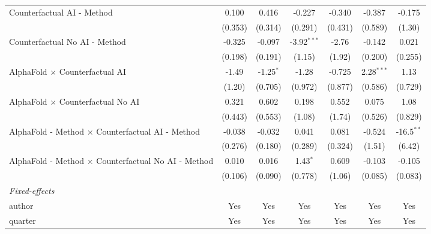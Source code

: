 \begin{tabular}{lcccccc}
   Counterfactual AI - Method                                 & 0.100   & 0.416       & -0.227        & -0.340     & -0.387       & -0.175\\   
                                                              & (0.353) & (0.314)     & (0.291)       & (0.431)    & (0.589)      & (1.30)\\   
   Counterfactual No AI - Method                              & -0.325  & -0.097      & -3.92$^{***}$ & -2.76      & -0.142       & 0.021\\   
                                                              & (0.198) & (0.191)     & (1.15)        & (1.92)     & (0.200)      & (0.255)\\   
   AlphaFold $\times$ Counterfactual AI                       & -1.49   & -1.25$^{*}$ & -1.28         & -0.725     & 2.28$^{***}$ & 1.13\\   
                                                              & (1.20)  & (0.705)     & (0.972)       & (0.877)    & (0.586)      & (0.729)\\   
   AlphaFold $\times$ Counterfactual No AI                    & 0.321   & 0.602       & 0.198         & 0.552      & 0.075        & 1.08\\   
                                                              & (0.443) & (0.553)     & (1.08)        & (1.74)     & (0.526)      & (0.829)\\   
   AlphaFold - Method $\times$ Counterfactual AI - Method     & -0.038  & -0.032      & 0.041         & 0.081      & -0.524       & -16.5$^{**}$\\   
                                                              & (0.276) & (0.180)     & (0.289)       & (0.324)    & (1.51)       & (6.42)\\   
   AlphaFold - Method $\times$ Counterfactual No AI - Method  & 0.010   & 0.016       & 1.43$^{*}$    & 0.609      & -0.103       & -0.105\\   
                                                              & (0.106) & (0.090)     & (0.778)       & (1.06)     & (0.085)      & (0.083)\\   
   \midrule
   \emph{Fixed-effects}\\
   author                                                     & Yes     & Yes         & Yes           & Yes        & Yes          & Yes\\  
   quarter                                                    & Yes     & Yes         & Yes           & Yes        & Yes          & Yes\\  

\end{tabular}
